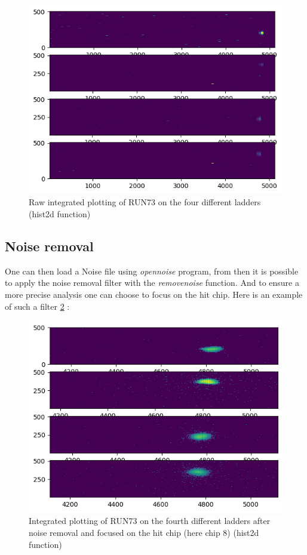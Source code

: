 \documentclass[12pt,oneside,a4]{article}
\begin{document}
\begin{figure}[h]
        \centering
        \includegraphics[scale =0.7]{figures/Without_noise removal.png}
        \caption{Raw integrated plotting of RUN73 on the four different ladders (hist2d function)}
        \label{fig:12}
\end{figure}

    \subsection{Noise removal}
    
One can then load a Noise file using \textit{open\textunderscore noise} program, from then it is possible to apply the noise removal filter with the \textit{remove\textunderscore noise} function. And to ensure a more precise analysis one can choose to focus on the hit chip. Here is an example of such a filter \ref{fig:13} :

    \begin{figure}[h]
        \centering
        \includegraphics[scale =0.5]{figures/With_noise_removal_and_chip_focus.png}
        \caption{Integrated plotting of RUN73 on the fourth different ladders after noise removal and focused on the hit chip (here chip 8) (hist2d function)}
        \label{fig:13}
    \end{figure}
\newpage
\end{document}
